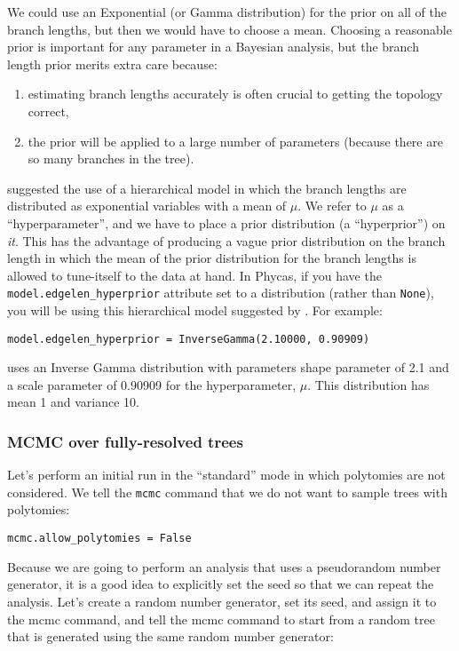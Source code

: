\documentclass{article}
\newcommand{\cmd}[1]{\texttt{#1}\xspace}
\newcommand{\phycas}{Phycas\xspace}
\begin{document}
We could use an Exponential (or Gamma distribution) for the prior on all of the branch lengths, but then we would have to choose a mean.
Choosing a reasonable prior is important for any parameter in a Bayesian analysis, but 
the branch length prior merits extra care because:
\begin{enumerate}
	\item  estimating branch lengths accurately is often crucial to getting the topology correct,
	\item the prior will be applied to a large number of parameters (because there are so many branches in the tree).
\end{enumerate}
\citet{SuchardWS2001} suggested the use of a hierarchical model in which the branch lengths are distributed as exponential variables with a mean of $\mu$.
We refer to $\mu$ as a ``hyperparameter'', and we have to place a prior distribution (a ``hyperprior'') on {\em it}.
This has the advantage of producing a vague prior distribution on the branch length in which the 
mean of the prior distribution for the branch lengths is allowed to tune-itself to the data at hand.
In \phycas, if you have the \cmd{model.edgelen\_hyperprior} attribute set to a distribution (rather than \texttt{None}), you will be using this hierarchical model suggested by \citet{SuchardWS2001}.
For example:
\begin{verbatim}
model.edgelen_hyperprior = InverseGamma(2.10000, 0.90909)
\end{verbatim}
uses an Inverse Gamma distribution with parameters shape parameter of 2.1 and a scale parameter of 0.90909 for the hyperparameter, $\mu$.
This distribution has mean 1 and variance 10.

\subsubsection{MCMC over fully-resolved trees}
Let's perform an initial run in the ``standard'' mode in which polytomies are not considered.
We tell the \cmd{mcmc} command that we do not want to sample trees with polytomies:
\begin{verbatim}
mcmc.allow_polytomies = False
\end{verbatim}

Because we are going to perform an analysis that uses a pseudorandom number generator, it is a 
good idea to explicitly set the seed so that we can repeat the analysis.
Let's create a random number generator, set its seed, and assign it to the mcmc command, and 
tell the mcmc command to start from a random tree that is generated using the same random
number generator:
\end{document}
